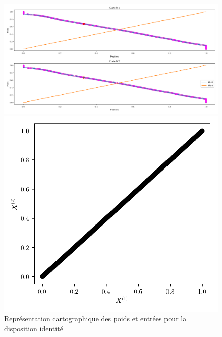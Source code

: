 \begin{figure}
\begin{minipage}{0.66\textwidth}
	\includegraphics[width=\textwidth]{2som_id_w.pdf}
	\caption{Représentation cartographique des poids et entrées pour la disposition identité}
\end{minipage}
\begin{minipage}{0.33\textwidth}
	\includegraphics[width=\textwidth]{2som_id_in}
\end{minipage}
\end{figure}

